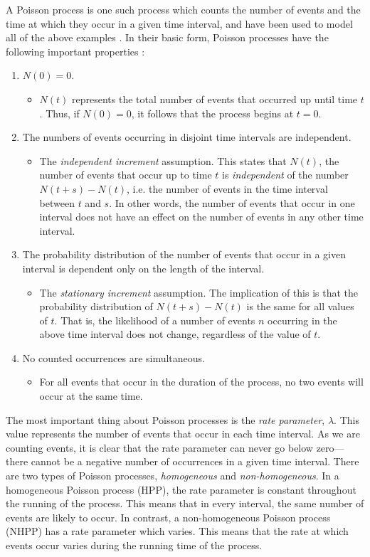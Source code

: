 \documentclass[a4paper,11pt]{article}
\begin{document}
A Poisson process is one such process which counts the number of events and the
time at which they occur in a given time interval, and have been used to model
all of the above examples
\cite{hajjam2008approach,cannizzaro1978results,arlitt1997internet}. In their
basic form, Poisson processes have the following important properties
\cite{ross1997simulation}:
\begin{enumerate}
\item $N(0)=0$.
\begin{itemize}
\item $N(t)$ represents the total number of events that occurred up until time
     $t$. Thus, if $N(0)=0$, it follows that the process begins at $t=0$.
\end{itemize}
\item The numbers of events occurring in disjoint time intervals are independent.
\begin{itemize}
\item The \emph{independent increment} assumption. This states that $N(t)$, the
     number of events that occur up to time $t$ is \emph{independent} of the
     number $N(t+s)-N(t)$, i.e. the number of events in the time interval
     between $t$ and $s$. In other words, the number of events that occur in one
     interval does not have an effect on the number of events in any other time
     interval.
\end{itemize}
\item The probability distribution of the number of events that occur in a given
   interval is dependent only on the length of the interval.
\begin{itemize}
\item The \emph{stationary increment} assumption. The implication of this is that
     the probability distribution of $N(t+s)-N(t)$ is the same for all values of
     $t$. That is, the likelihood of a number of events $n$ occurring in the
     above time interval does not change, regardless of the value of $t$.
\end{itemize}
\item No counted occurrences are simultaneous.
\begin{itemize}
\item For all events that occur in the duration of the process, no two events
     will occur at the same time.
\end{itemize}
\end{enumerate}

The most important thing about Poisson processes is the \emph{rate parameter},
$\lambda$. This value represents the number of events that occur in each time
interval. As we are counting events, it is clear that the rate parameter can
never go below zero---there cannot be a negative number of occurrences in a
given time interval. There are two types of Poisson processes,
\emph{homogeneous} and \emph{non-homogeneous}. In a homogeneous Poisson process (HPP),
the rate parameter is constant throughout the running of the process. This means
that in every interval, the same number of events are likely to occur. In
contrast, a non-homogeneous Poisson process (NHPP) has a rate parameter which
varies. This means that the rate at which events occur varies during the running
time of the process.
\end{document}
